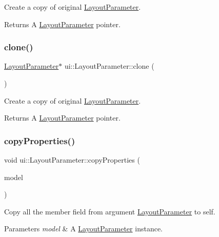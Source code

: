 Create a copy of original \hyperlink{classui_1_1LayoutParameter}{Layout\+Parameter}. \begin{DoxyReturn}{Returns}
A \hyperlink{classui_1_1LayoutParameter}{Layout\+Parameter} pointer. 
\end{DoxyReturn}
\mbox{\label{classui_1_1LayoutParameter_ac4c425f5ae7ac0c2fc207b6c6d772115}} 
\subsubsection{\texorpdfstring{clone()}{clone()}\hspace{0.1cm}{\footnotesize\ttfamily [2/2]}}
{\footnotesize\ttfamily \hyperlink{classui_1_1LayoutParameter}{Layout\+Parameter}$\ast$ ui\+::\+Layout\+Parameter\+::clone (\begin{DoxyParamCaption}{ }\end{DoxyParamCaption})}

Create a copy of original \hyperlink{classui_1_1LayoutParameter}{Layout\+Parameter}. \begin{DoxyReturn}{Returns}
A \hyperlink{classui_1_1LayoutParameter}{Layout\+Parameter} pointer. 
\end{DoxyReturn}
\mbox{\label{classui_1_1LayoutParameter_af4c1b163c31ac6244902610334ead73f}} 
\subsubsection{\texorpdfstring{copy\+Properties()}{copyProperties()}\hspace{0.1cm}{\footnotesize\ttfamily [1/2]}}
{\footnotesize\ttfamily void ui\+::\+Layout\+Parameter\+::copy\+Properties (\begin{DoxyParamCaption}\item[{\hyperlink{classui_1_1LayoutParameter}{Layout\+Parameter} $\ast$}]{model }\end{DoxyParamCaption})\hspace{0.3cm}{\ttfamily [virtual]}}

Copy all the member field from argument \hyperlink{classui_1_1LayoutParameter}{Layout\+Parameter} to self. 
\begin{DoxyParams}{Parameters}
{\em model} & A \hyperlink{classui_1_1LayoutParameter}{Layout\+Parameter} instance. \\
\hline
\end{DoxyParams}


